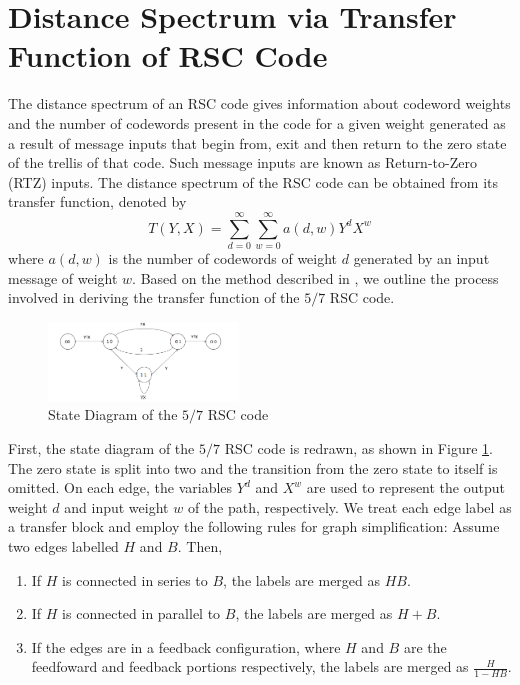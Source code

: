 \section{Distance Spectrum via Transfer Function of RSC Code}
\label{sec4}
The distance spectrum of an RSC code gives information about codeword weights and the number of codewords present in the code for a given weight generated as a result of message inputs that begin from, exit and then return to the zero state of the trellis of that code. Such message inputs are known as Return-to-Zero (RTZ) inputs. The distance spectrum of the RSC code can be obtained from its transfer function, denoted by $$T(Y,X)=\sum_{d=0}^{\infty}\sum_{w=0}^{\infty} a(d,w)Y^dX^w$$ where $a(d,w)$ is the number of codewords of weight $d$ generated by an input message of weight $w$.
Based on the method described in \cite{ref3}, we outline the process involved in deriving the transfer function of the $5/7$ RSC code. 

\begin{figure}[h]
\centering
		\includegraphics[width=0.45\textwidth]{tf.png}
		\caption{State Diagram of the $5/7$ RSC code }
		\label{Txfig4}
		\end{figure}
First, the state diagram of the $5/7$ RSC code is redrawn, as shown in Figure \ref{Txfig4}. The zero state is split into two and the transition from the zero state to itself is omitted. On each edge, the variables $Y^d$ and $X^w$ are used to represent the output weight $d$ and input weight $w$ of the path, respectively. We treat each edge label as a transfer block and employ the following rules for graph simplification:
Assume two edges labelled $H$ and $B$. Then,

\begin{enumerate}
\item If $H$ is connected in series to $B$, the labels are merged as $HB$.

\item If $H$ is connected in parallel to $B$, the labels are merged as $H+B$.

\item If the edges are in a feedback configuration, where $H$ and $B$ are the feedfoward and feedback portions respectively, the labels are merged as $\frac{H}{1-HB}$.
\end{enumerate}

